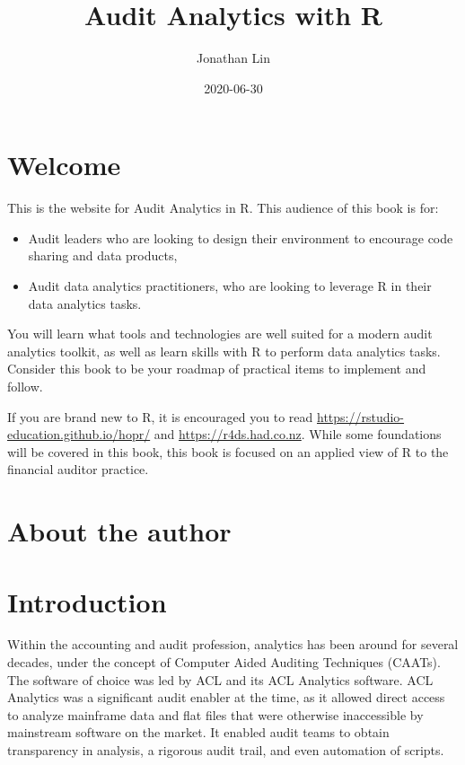 \documentclass[
]{book}
\title{Audit Analytics with R}
\author{Jonathan Lin}
\date{2020-06-30}
\providecommand{\tightlist}{%
  \setlength{\itemsep}{0pt}\setlength{\parskip}{0pt}}
\begin{document}
\maketitle

{
\setcounter{tocdepth}{1}
\tableofcontents
}
\hypertarget{welcome}{%
\chapter*{Welcome}\label{welcome}}

This is the website for Audit Analytics in R. This audience of this book is for:

\begin{itemize}
\tightlist
\item
  Audit leaders who are looking to design their environment to encourage code sharing and data products,
\item
  Audit data analytics practitioners, who are looking to leverage R in their data analytics tasks.
\end{itemize}

You will learn what tools and technologies are well suited for a modern audit analytics toolkit, as well as learn skills with R to perform data analytics tasks. Consider this book to be your roadmap of practical items to implement and follow.

If you are brand new to R, it is encouraged you to read \url{https://rstudio-education.github.io/hopr/} and \url{https://r4ds.had.co.nz}. While some foundations will be covered in this book, this book is focused on an applied view of R to the financial auditor practice.

\hypertarget{about-the-author}{%
\chapter*{About the author}\label{about-the-author}}

\hypertarget{intro}{%
\chapter{Introduction}\label{intro}}

Within the accounting and audit profession, analytics has been around for several decades, under the concept of Computer Aided Auditing Techniques (CAATs). The software of choice was led by ACL and its ACL Analytics software. ACL Analytics was a significant audit enabler at the time, as it allowed direct access to analyze mainframe data and flat files that were otherwise inaccessible by mainstream software on the market. It enabled audit teams to obtain transparency in analysis, a rigorous audit trail, and even automation of scripts.
\end{document}
